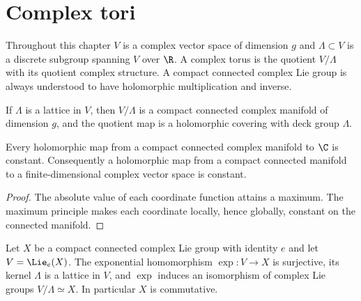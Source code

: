 \section{Complex tori}
\label{mumford-I1}

\begin{convention}
\label{mumford-conv-complex-analytic}
Throughout this chapter $V$ is a complex vector space of dimension $g$ and
$\Lambda\subset V$ is a discrete subgroup spanning $V$ over $\R$.  A complex
torus is the quotient $V/\Lambda$ with its quotient complex structure.  A
compact connected complex Lie group is always understood to have holomorphic
multiplication and inverse.
\notready
\end{convention}

\begin{lemma}
\label{mumford-lem-compact-lattice-quotient}
If $\Lambda$ is a lattice in $V$, then $V/\Lambda$ is a compact connected
complex manifold of dimension $g$, and the quotient map is a holomorphic
covering with deck group $\Lambda$.
\notready
\end{lemma}

\begin{lemma}
\label{mumford-lem-compact-holomorphic-functions}
Every holomorphic map from a compact connected complex manifold to $\C$ is
constant.  Consequently a holomorphic map from a compact connected manifold
to a finite-dimensional complex vector space is constant.
\begin{proof}
The absolute value of each coordinate function attains a maximum.  The maximum
principle makes each coordinate locally, hence globally, constant on the
connected manifold.
\end{proof}
\notready
\end{lemma}

\begin{theorem}
\label{mumford-thm-complex-lie-uniformization}
Let $X$ be a compact connected complex Lie group with identity $e$ and let
$V=\Lie_e(X)$.  The exponential homomorphism $\exp:V\to X$ is surjective,
its kernel $\Lambda$ is a lattice in $V$, and $\exp$ induces an isomorphism
of complex Lie groups $V/\Lambda\simeq X$.  In particular $X$ is commutative.
\notready
\end{theorem}

